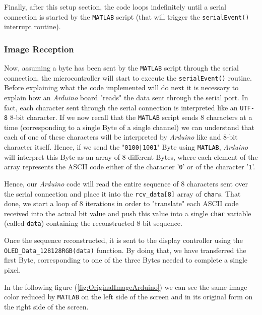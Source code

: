 \documentclass[a4paper]{article}
\begin{document}
        Finally, after this setup section, the code loops indefinitely until a serial connection is started by the \texttt{MATLAB} script (that will trigger the \texttt{serialEvent()} interrupt routine).

        \subsubsection{Image Reception}
            Now, assuming a byte has been sent by the \texttt{MATLAB} script through the serial connection, the microcontroller will start to execute the \texttt{serialEvent()} routine.
            Before explaining what the code implemented will do next it is necessary to explain how an \emph{Arduino} board "reads" the data sent through the serial port. In fact, each character sent through the serial connection is interpreted like an \texttt{UTF-8} 8-bit character. If we now recall that the \texttt{MATLAB} script sends 8 characters at a time (corresponding to a single Byte of a single channel) we can understand that each of one of these characters will be interpreted by \emph{Arduino} like and 8-bit character itself. Hence, if we send the "\texttt{0100|1001}" Byte using \texttt{MATLAB}, \emph{Arduino} will interpret this Byte as an array of 8 different Bytes, where each element of the array represents the ASCII code either of the character '\texttt{0}' or of the character '\texttt{1}'.

            Hence, our \emph{Arduino} code will read the entire sequence of 8 characters sent over the serial connection and place it into the \texttt{rcv\_data[8]} array of \texttt{char}s. That done, we start a loop of 8 iterations in order to "translate" each ASCII code received into the actual bit value and push this value into a single \texttt{char} variable (called \texttt{data}) containing the reconstructed 8-bit sequence.

            Once the sequence reconstructed, it is sent to the display controller using the \texttt{OLED\_Data\_128128RGB(data)} function. By doing that, we have transferred the first Byte, corresponding to one of the three Bytes needed to complete a single pixel.

            In the following figure (\ref{fig:OriginalImageArduino}) we can see the same image color reduced by \texttt{MATLAB} on the left side of the screen and in its original form on the right side of the screen.
\end{document}
